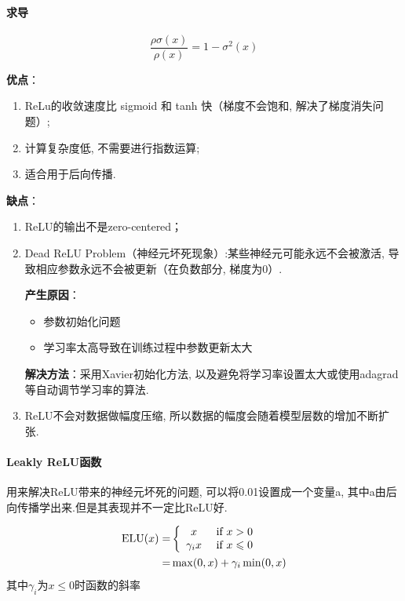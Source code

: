 \documentclass[a4paper]{article}
\theoremstyle{definition}
\numberwithin{equation}{section}
\begin{document}
\paragraph{求导}
$$\frac{\rho\sigma(x)}{\rho(x)}=1-\sigma^2(x)$$

\textbf{优点}：
\begin{enumerate}
    \renewcommand{\labelenumi}{(\theenumi)}
    \item   ReLu的收敛速度比 sigmoid 和 tanh 快（梯度不会饱和, 解决了梯度消失问题）;
     \item  计算复杂度低, 不需要进行指数运算;
     \item 适合用于后向传播.
\end{enumerate}

\textbf{缺点}：
\begin{enumerate} 
    \renewcommand{\labelenumi}{(\theenumi)}
\item  ReLU的输出不是zero-centered； 
\item  Dead ReLU Problem（神经元坏死现象）:某些神经元可能永远不会被激活, 导致相应参数永远不会被更新（在负数部分, 梯度为0）.

\textbf{产生原因}：
\begin{itemize}
    \item 参数初始化问题
    \item 学习率太高导致在训练过程中参数更新太大
\end{itemize}
 \textbf{解决方法}：采用Xavier初始化方法, 以及避免将学习率设置太大或使用adagrad等自动调节学习率的算法.
\item ReLU不会对数据做幅度压缩, 所以数据的幅度会随着模型层数的增加不断扩张.
\end{enumerate}
\paragraph{Leakly  ReLU函数}
用来解决ReLU带来的神经元坏死的问题, 可以将0.01设置成一个变量a, 其中a由后向传播学出来.但是其表现并不一定比ReLU好.

\begin{align*}
\mathrm{ELU}(x)=&
\left\{ 
\begin{array}{c c}    
    x  \ & \text{if} \  x>0 \\    
    \gamma_i x \ & \text{if} \ x \leqslant 0  \\   
\end{array} 
\right. \\
=& \max(0, x)+\gamma_i \min(0, x)
\end{align*}
其中$\gamma_i$为$x \leqslant 0 $时函数的斜率
\end{document}
